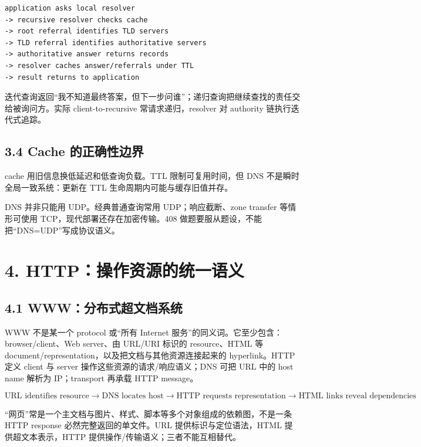 \documentclass[UTF8,fontset=none,11pt,a4paper]{ctexart}
\begin{document}
\begin{lstlisting}
application asks local resolver
-> recursive resolver checks cache
-> root referral identifies TLD servers
-> TLD referral identifies authoritative servers
-> authoritative answer returns records
-> resolver caches answer/referrals under TTL
-> result returns to application
\end{lstlisting}

迭代查询返回``我不知道最终答案，但下一步问谁''；递归查询把继续查找的责任交给被询问方。实际
client-to-recursive 常请求递归，resolver 对 authority 链执行迭代式追踪。

\subsection{3.4 Cache
的正确性边界}\label{34-cache-ux7684ux6b63ux786eux6027ux8fb9ux754c}

cache 用旧信息换低延迟和低查询负载。TTL 限制可复用时间，但 DNS
不是瞬时全局一致系统：更新在 TTL 生命周期内可能与缓存旧值并存。

DNS 并非只能用 UDP。经典普通查询常用 UDP；响应截断、zone transfer
等情形可使用 TCP，现代部署还存在加密传输。408
做题要服从题设，不能把``DNS=UDP''写成协议语义。

\section{4.
HTTP：操作资源的统一语义}\label{4-httpux64cdux4f5cux8d44ux6e90ux7684ux7edfux4e00ux8bedux4e49}

\subsection{4.1 WWW：分布式超文档系统}

WWW 不是某一个 protocol 或“所有 Internet 服务”的同义词。它至少包含：browser/client、Web server、由 URL/URI 标识的 resource、HTML 等 document/representation，以及把文档与其他资源连接起来的 hyperlink。HTTP 定义 client 与 server 操作这些资源的请求/响应语义；DNS 可把 URL 中的 host name 解析为 IP；transport 再承载 HTTP message。

\[
\boxed{\text{URL identifies resource}\to\text{DNS locates host}\to
\text{HTTP requests representation}\to\text{HTML links reveal dependencies}}
\]

“网页”常是一个主文档与图片、样式、脚本等多个对象组成的依赖图，不是一条 HTTP response 必然完整返回的单文件。URL 提供标识与定位语法，HTML 提供超文本表示，HTTP 提供操作/传输语义；三者不能互相替代。
\end{document}
